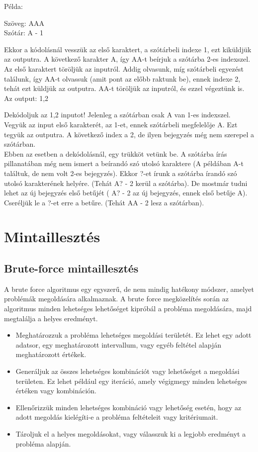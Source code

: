 \documentclass[margin=0px]{article}
\begin{document}
\begin{description}
        Példa:

        Szöveg: AAA\\
        Szótár: A - 1

        Ekkor a kódolásnál vesszük az első karaktert, a szótárbeli indexe 1, ezt kiküldjük az outputra. A következő karakter A, így AA-t beírjuk a szótárba 2-es indexszel. Az első karaktert töröljük az inputról. Addig olvasunk, míg szótárbeli egyezést találunk, így AA-t olvassuk (amit pont az előbb raktunk be), ennek indexe 2, tehát ezt küldjük az outputra. AA-t töröljük az inputról, és ezzel végeztünk is. Az output: 1,2

        Dekódoljuk az 1,2 inputot! Jelenleg a szótárban csak A van 1-es indexszel. Vegyük az input első karakterét, az 1-et, ennek szótárbeli megfelelője A. Ezt tegyük az outputra. A következő index a 2, de ilyen bejegyzés még nem szerepel a szótárban. \\

        Ebben az esetben a dekódolásnál, egy trükköt vetünk be. A szótárba írás pillanatában még nem ismert a beírandó szó utolsó karaktere (A példában A-t találtuk, de nem volt 2-es bejegyzés). Ekkor ?-et írunk a szótárba írandó szó utolsó karakterének helyére. (Tehát A? - 2 kerül a szótárba). De mostmár tudni lehet az új bejegyzés első betűjét ( A? - 2 az új bejegyzés, ennek első betűje A). Cseréljük le a ?-et erre a betűre. (Tehát AA - 2 lesz a szótárban).
\end{description}
\section{Mintaillesztés}
\subsection{Brute-force mintaillesztés}
A brute force algoritmus egy egyszerű, de nem mindig hatékony módszer, amelyet problémák megoldására alkalmaznak. A brute force megközelítés során az algoritmus minden lehetséges lehetőséget kipróbál a probléma megoldására, majd megtalálja a helyes eredményt.

\begin{itemize}
    \item Meghatározzuk a probléma lehetséges megoldási területét. Ez lehet egy adott adatsor, egy meghatározott intervallum, vagy egyéb feltétel alapján meghatározott értékek.
    \item Generáljuk az összes lehetséges kombinációt vagy lehetőséget a megoldási területen. Ez lehet például egy iteráció, amely végigmegy minden lehetséges értéken vagy kombináción.
    \item Ellenőrizzük minden lehetséges kombináció vagy lehetőség esetén, hogy az adott megoldás kielégíti-e a probléma feltételeit vagy kritériumait.
    \item Tároljuk el a helyes megoldásokat, vagy válasszuk ki a legjobb eredményt a probléma alapján.
\end{itemize}
\end{document}
